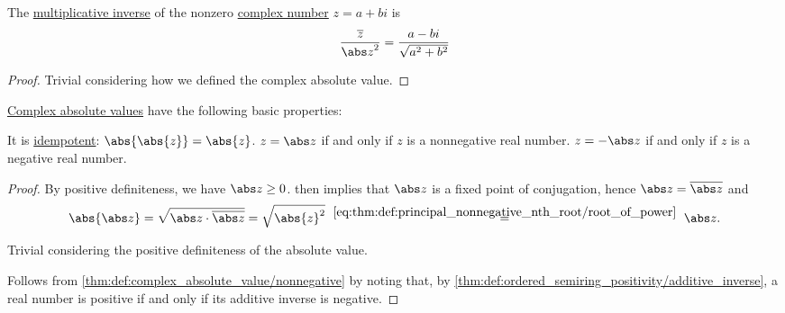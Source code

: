\begin{proposition}\label{thm:complex_multiplicative_inverse}
  The \hyperref[def:semiring]{multiplicative inverse} of the nonzero \hyperref[def:complex_numbers]{complex number} \( z = a + bi \) is
  \begin{equation}\label{eq:thm:complex_multiplicative_inverse}
    \frac {\oline z} {{\abs z}^2} = \frac {a - bi} {\sqrt{a^2 + b^2}}
  \end{equation}
\end{proposition}
\begin{proof}
  Trivial considering how we defined the complex absolute value.
\end{proof}

\begin{proposition}\label{thm:def:complex_absolute_value}
  \hyperref[def:complex_absolute_value]{Complex absolute values} have the following basic properties:
  \begin{thmenum}
     It is \hyperref[def:idempotent_function]{idempotent}: \( \abs{\abs{z}} = \abs{z} \).
     \( z = \abs z \) if and only if \( z \) is a nonnegative real number.
     \( z = -\abs z \) if and only if \( z \) is a negative real number.
  \end{thmenum}
\end{proposition}
\begin{proof}
   By positive definiteness, we have \( \abs z \geq 0 \).  then implies that \( \abs z \) is a fixed point of conjugation, hence \( \abs z = \oline{\abs z} \) and
  \begin{equation*}
    \abs{\abs z}
    =
    \sqrt{ \abs z \cdot \oline{\abs z} }
    =
    \sqrt { \abs{z}^2 }
    \reloset {\eqref{eq:thm:def:principal_nonnegative_nth_root/root_of_power}} =
    \abs z.
  \end{equation*}

   Trivial considering the positive definiteness of the absolute value.

   Follows from \cref{thm:def:complex_absolute_value/nonnegative} by noting that, by \cref{thm:def:ordered_semiring_positivity/additive_inverse}, a real number is positive if and only if its additive inverse is negative.
\end{proof}

